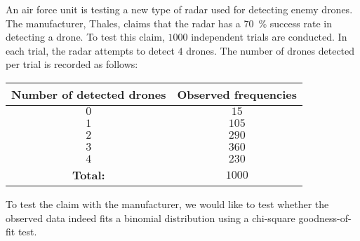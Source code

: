 \begin{question}{20}{
    An air force unit is testing a new type of radar used for detecting enemy drones.
    The manufacturer, Thales, claims that the radar has a \SI{70}{\percent} success rate in detecting a drone.
    To test this claim, $1000$ independent trials are conducted. In each trial, the radar attempts to detect $4$ drones. The number of drones detected per trial is recorded as follows:
    \begin{center}
        \begin{tabular}{cc}
            \toprule
                \textbf{Number of detected drones} & \textbf{Observed frequencies} \\
            \midrule
                $0$ & $15$ \\
                $1$ & $105$ \\
                $2$ & $290$ \\
                $3$ & $360$ \\
                $4$ & $230$ \\
            \midrule
                \textbf{Total:} & $1000$ \\
            \bottomrule
        \end{tabular}
    \end{center}
    \vspace{1ex}

    To test the claim with the manufacturer, we would like to test whether the observed data indeed fits a binomial distribution using a chi-square goodness-of-fit test.
}



\end{question}
